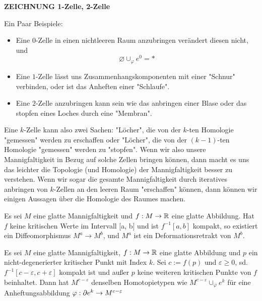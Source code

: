 \textbf{ZEICHNUNG 1-Zelle, 2-Zelle}

Ein Paar Beispiele: 
\begin{itemize}
    \item Eine $0$-Zelle in einen nichtleeren Raum anzubringen 
        verändert diesen nicht, und
        \[\varnothing \cup_{\varphi} e^0 = \ast\]
    \item Eine $1$-Zelle lässt uns Zusammenhangskomponenten mit einer "Schnur"
            verbinden, oder ist das Anheften einer "Schlaufe".
    \item Eine $2$-Zelle anzubringen kann sein wie das anbringen einer Blase oder
        das stopfen eines Loches durch eine "Membran".
\end{itemize}

Eine $k$-Zelle kann also zwei Sachen: "Löcher", die von der $k$-ten Homologie
"gemessen" werden zu erschaffen oder "Löcher", die von der $(k-1)$-ten Homologie
"gemessen" werden zu "stopfen". Wenn wir also unsere Mannigfaltigkeit in 
Bezug auf solche Zellen bringen können, dann macht es uns das leichter die 
Topologie (und Homologie) der Mannigfaltigkeit besser zu verstehen. Wenn wir
sogar die gesamte Mannigfaltigkeit durch iteratives anbringen von $k$-Zellen
an den leeren Raum "erschaffen" können, dann können wir einigen Aussagen über 
die Homologie des Raumes machen. 


\begin{theorem}
    \label{theorem:erstes deformationslemma}
    Es sei $M$ eine glatte Mannigfaltigkeit und $f: M \rightarrow { \mathbb R }$ eine
    glatte Abbildung. Hat $f$ keine kritischen Werte im Intervall [a, b] und ist
    $f^{-1}[a, b]$ kompakt, so existiert ein Diffeomorphismus 
    $M^a \rightarrow M^b$, und $M^a$ ist ein Deformationsretrakt von $M^b$.
\end{theorem}

\begin{theorem}
    \label{theorem:zweites deformations-lemma}
    Es sei $M$ eine glatte Mannigfaltigkeit, $f: M \rightarrow { \mathbb R }$ eine glatte
    Abbildung und $p$ ein nicht-degenerierter kritischer Punkt mit Index 
    $k$. Sei $c := f(p)$ und $\varepsilon \geq 0$, sd. 
    $f^{-1}[c - \varepsilon, c + \varepsilon]$ kompakt ist und außer $p$ keine 
    weiteren kritischen Punkte von $f$ beinhaltet. Dann hat $M^{c-\varepsilon}$
    denselben Homotopietypen wie $M^{c - \varepsilon} \cup_{\varphi} e^k$
    für eine Anheftungsabbildung 
    $\varphi: { \partial } e^k \rightarrow M^{c-\varepsilon}$
\end{theorem}
